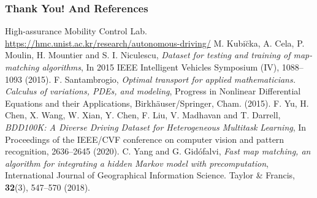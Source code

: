 \documentclass[aspectratio=169, bigfiles]{beamer}
\begin{document}
\begin{frame}
\frametitle{Thank You! And References}

\begin{thebibliography}{9}
\scriptsize{


  High-assurance Mobility Control Lab. \url{https://hmc.unist.ac.kr/research/autonomous-driving/}
 M. Kubi\u cka, A. Cela, P. Moulin, H. Mountier and S. I. Niculescu, \textit{Dataset for testing and training of map-matching algorithms}, In 2015 IEEE Intelligent Vehicles Symposium (IV), 1088--1093 (2015).
 F. Santambrogio, \textit{Optimal transport for applied mathematicians. Calculus of variations, PDEs, and modeling}, Progress in Nonlinear Differential Equations and their Applications, Birkh\"{a}user/Springer, Cham. (2015).
 F. Yu, H. Chen, X. Wang, W. Xian, Y. Chen, F. Liu, V. Madhavan and T. Darrell, \textit{BDD100K: A Diverse Driving Dataset for Heterogeneous Multitask Learning}, In Proceedings of the IEEE/CVF conference on computer vision and pattern recognition, 2636--2645 (2020).
 C. Yang and G. Gid\' ofalvi, \textit{Fast map matching, an algorithm for integrating a hidden Markov model with precomputation}, International Journal of Geographical Information Science. Taylor \& Francis, \textbf{32}(3), 547--570 (2018).}
\end{thebibliography}

\end{frame}
\end{document}
